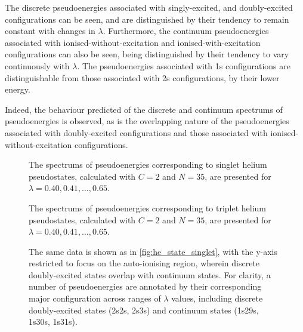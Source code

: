 \documentclass[]{article}
\begin{document}
The discrete pseudoenergies associated with singly-excited, and doubly-excited
configurations can be seen, and are distinguished by their tendency to remain
constant with changes in $\lambda$.
Furthermore, the continuum pseudoenergies associated with
ionised-without-excitation and ionised-with-excitation configurations can also
be seen, being distinguished by their tendency to vary continuously with
$\lambda$.
The pseudoenergies associated with 1s configurations are distinguishable from
those associated with 2s configurations, by their lower energy.

Indeed, the behaviour predicted of the discrete and continuum spectrums of
pseudoenergies is observed, as is the overlapping nature of the pseudoenergies
associated with doubly-excited configurations and those associated with
ionised-without-excitation configurations.

\begin{figure}[h]
  \begin{center}
    
  \end{center}
  \caption[Singlet Helium Pseudoenergies]{
    The spectrums of pseudoenergies corresponding to singlet helium
    pseudostates, calculated with $C = 2$ and $N = 35$, are presented for
    $\lambda = 0.40, 0.41, \dotsc, 0.65$.
  }
  \label{fig:he_state_singlet}
\end{figure}

\begin{figure}[h]
  \begin{center}
    
  \end{center}
  \caption[Triplet Helium Pseudoenergies]{
    The spectrums of pseudoenergies corresponding to triplet helium
    pseudostates, calculated with $C = 2$ and $N = 35$, are presented for
    $\lambda = 0.40, 0.41, \dotsc, 0.65$.
  }
  \label{fig:he_state_triplet}
\end{figure}

\begin{figure}[h]
  \begin{center}
    
  \end{center}
  \caption[Singlet Helium Pseudoenergies - Auto-Ionising Region]{
    The same data is shown as in \autoref{fig:he_state_singlet}, with the y-axis
    restricted to focus on the auto-ionising region, wherein discrete
    doubly-excited states overlap with continuum states.
    For clarity, a number of pseudoenergies are annotated by their corresponding
    major configuration across ranges of $\lambda$ values, including discrete
    doubly-excited states (2s2s, 2s3s) and continuum states (1s29s, 1s30s,
    1s31s).
  }
  \label{fig:he_state_singlet_auto_ionising}
\end{figure}
\end{document}
